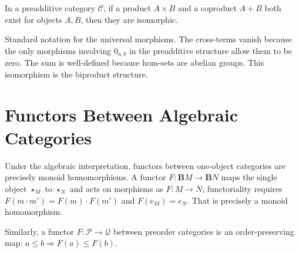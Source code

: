 \begin{theorem}
In a preadditive category $\mathcal{C}$, if a product $A \times B$ and a
coproduct $A + B$ both exist for objects $A, B$, then they are isomorphic.
\end{theorem}

\begin{prooflog}
           {Standard notation for the universal morphisms.}
           {The cross-terms vanish because the only morphisms involving $0_{a,b}$
            in the preadditive structure allow them to be zero.}
           {The sum is well-defined because hom-sets are abelian groups.}
           {This isomorphism is the biproduct structure.}
\end{prooflog}

\section{Functors Between Algebraic Categories}

Under the algebraic interpretation, functors between one-object categories are
precisely monoid homomorphisms. A functor $F : \mathbf{B}M \to \mathbf{B}N$
maps the single object $\star_M$ to $\star_N$ and acts on morphisms as
$F : M \to N$; functoriality requires $F(m \cdot m') = F(m) \cdot F(m')$ and
$F(e_M) = e_N$. That is precisely a monoid homomorphism.

Similarly, a functor $F : \mathcal{P} \to \mathcal{Q}$ between preorder categories
is an order-preserving map: $a \leq b \Rightarrow F(a) \leq F(b)$.


